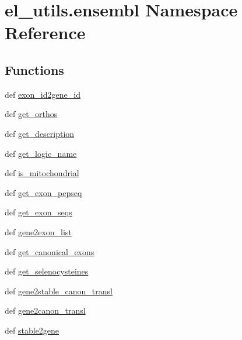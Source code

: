 \hypertarget{namespaceel__utils_1_1ensembl}{\section{el\-\_\-utils.\-ensembl Namespace Reference}
\label{namespaceel__utils_1_1ensembl}
}
\subsection*{Functions}
\begin{DoxyCompactItemize}
\item 
def \hyperlink{namespaceel__utils_1_1ensembl_a4ce85fcceb23615333f7d3bf9aa66be6}{exon\-\_\-id2gene\-\_\-id}
\item 
def \hyperlink{namespaceel__utils_1_1ensembl_a7d722b6165c3ea9d7794607edd57e302}{get\-\_\-orthos}
\item 
def \hyperlink{namespaceel__utils_1_1ensembl_a1824e701d17b97129de2849ec3eddddb}{get\-\_\-description}
\item 
def \hyperlink{namespaceel__utils_1_1ensembl_ab77ec7af8499b44c6c951016abeb357e}{get\-\_\-logic\-\_\-name}
\item 
def \hyperlink{namespaceel__utils_1_1ensembl_a49c06fccb9f5d574262bbea42704fb6a}{is\-\_\-mitochondrial}
\item 
def \hyperlink{namespaceel__utils_1_1ensembl_a7209a32d240721b5cce913d005241621}{get\-\_\-exon\-\_\-pepseq}
\item 
def \hyperlink{namespaceel__utils_1_1ensembl_a4e9f799e6eef1b113965e942487dcc67}{get\-\_\-exon\-\_\-seqs}
\item 
def \hyperlink{namespaceel__utils_1_1ensembl_a4a00b508d239ee53e98ec401e0cc54ee}{gene2exon\-\_\-list}
\item 
def \hyperlink{namespaceel__utils_1_1ensembl_a0d3d4fa7d2512178702285624215b2d1}{get\-\_\-canonical\-\_\-exons}
\item 
def \hyperlink{namespaceel__utils_1_1ensembl_a462145b70350353b526cb6b7447bdcb9}{get\-\_\-selenocysteines}
\item 
def \hyperlink{namespaceel__utils_1_1ensembl_afb23a4208db883709599aad25266427c}{gene2stable\-\_\-canon\-\_\-transl}
\item 
def \hyperlink{namespaceel__utils_1_1ensembl_a513044f84d0d1d551a674d93e093eabc}{gene2canon\-\_\-transl}
\item 
def \hyperlink{namespaceel__utils_1_1ensembl_a2da33603fc25e6c44455446bb3f14550}{stable2gene}
\item 

\end{DoxyCompactItemize}
